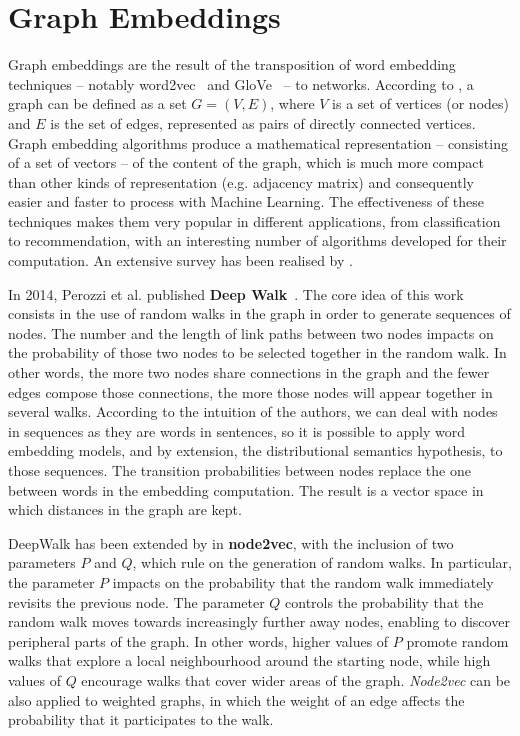 \documentclass{article}
\begin{document}
\section{Graph Embeddings}
\label{sec:intro-embeddings}
Graph embeddings are the result of the transposition of word embedding techniques -- notably word2vec~\citep{mikolov2013efficient} and GloVe~\citep{pennington2014glove} -- to networks. According to \cite{diestel2005graph}, a graph can be defined as a set $G = (V,E)$, where $V$ is a set of vertices (or nodes) and $E$ is the set of edges, represented as pairs of directly connected vertices. Graph embedding algorithms produce a mathematical representation -- consisting of a set of vectors -- of the content of the graph, which is much more compact than other kinds of representation (e.g. adjacency matrix) and consequently easier and faster to process with Machine Learning. The effectiveness of these techniques makes them very popular in different applications, from classification to recommendation, with an interesting number of algorithms developed for their computation. An extensive survey has been realised by \cite{goyal2018graphemb-survey}.

In 2014, Perozzi et al. published \textbf{Deep Walk}~\citep{perozzi2014deepwalk}. The core idea of this work consists in the use of random walks in the graph in order to generate sequences of nodes. The number and the length of link paths between two nodes impacts on the probability of those two nodes to be selected together in the random walk. In other words, the more two nodes share connections in the graph and the fewer edges compose those connections, the more those nodes will appear together in several walks. According to the intuition of the authors, we can deal with nodes in sequences as they are words in sentences, so it is possible to apply word embedding models, and by extension, the distributional semantics hypothesis, to those sequences. The transition probabilities between nodes replace the one between words in the embedding computation. The result is a vector space in which distances in the graph are kept.

DeepWalk has been extended by \cite{grover2016node2vec} in \textbf{node2vec}, with the inclusion of two parameters $P$ and $Q$, which rule on the generation of random walks. In particular, the parameter $P$ impacts on the probability that the random walk immediately revisits the previous node. The parameter $Q$ controls the probability that the random walk moves towards increasingly further away nodes, enabling to discover peripheral parts of the graph. In other words, higher values of $P$ promote random walks that explore a local neighbourhood around the starting node, while high values of $Q$ encourage walks that cover wider areas of the graph. \textit{Node2vec} can be also applied to weighted graphs, in which the weight of an edge affects the probability that it participates to the walk.
\end{document}

